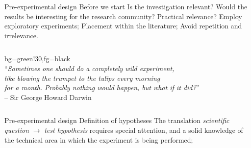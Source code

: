 \documentclass[t]{beamer}
\begin{document}

\begin{ftst}
{Pre-experimental design}
{Before we start}
\bitems Is the investigation relevant?
	\spitem Would the results be interesting for the research community?
	\spitem Practical relevance?
	\bitems Employ exploratory experiments;\eitem
	\spitem Placement within the literature;
	\bitems Avoid repetition and irrelevance.\eitem
\eitem
\begin{columns}[T]
\begin{colorblock}{}{bg=green!30,fg=black}
{\ \\\scriptsize``\textit{Sometimes one should do a completely wild experiment,\\like blowing the trumpet to the tulips every morning\\for a month. Probably nothing would happen, but what if it did?}''\\}
{\tiny -- Sir George Howard Darwin}
\end{colorblock}
\end{columns}
\end{ftst}


\begin{ftst}
{Pre-experimental design}
{Definition of hypotheses}
\bitems The translation \textit{scientific question} $\rightarrow$ \textit{test hypothesis} requires special attention, and a solid knowledge of the technical area in which the experiment is being performed;
\eitem
\vone
{}
\end{ftst}
\end{document}
